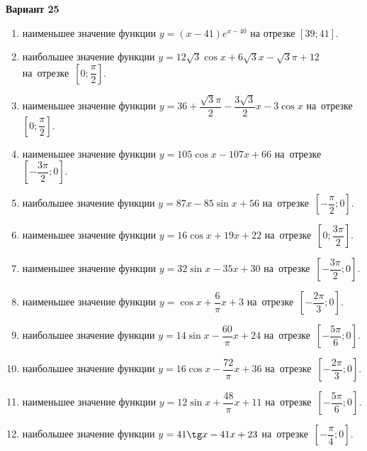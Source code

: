 \documentclass[a4paper,10pt]{article}
\begin{document}
\begin{center}\Large\textbf{Вариант 25}\end{center}

\begin{enumerate}
\item {} наименьшее значение функции $y = \left(x-41\right)e^{x-40}$ на отрезке $\left[39;41\right]$.

\item {} наибольшее значение функции $y = 12\sqrt{3}\cos x+6\sqrt{3}x-\sqrt{3}\pi +12$ на~отрезке~$\left[0;\dfrac{\pi }{2}\right]$.

\item {} наименьшее значение функции $y = 36+\dfrac{\sqrt{3} \pi}{2}-\dfrac{3\sqrt{3}}{2}x-3\cos x$ на~отрезке~$\left[0;\dfrac{\pi }{2}\right]$.

\item {} наименьшее значение функции $y = 105\cos x-107x+66$ на~отрезке~$\left[-\dfrac{3\pi }{2};0\right]$.

\item {} наибольшее значение функции $y = 87x-85\sin x+56$ на~отрезке~$\left[-\dfrac{\pi }{2};0\right]$.

\item {} наименьшее значение функции $y = 16\cos x+19x+22$ на~отрезке~$\left[0;\dfrac{3\pi }{2}\right]$.

\item {} наименьшее значение функции $y = 32\sin x-35x+30$ на~отрезке~$\left[-\dfrac{3\pi }{2};0\right]$.

\item {} наименьшее значение функции $y = \cos x+\dfrac{6}{\pi }x +3$ на~отрезке~$\left[-\dfrac{2\pi }{3};0\right]$.

\item {} наибольшее значение функции $y = 14\sin x-\dfrac{60}{\pi }x+24$ на~отрезке~$\left[-\dfrac{5\pi }{6};0\right]$.

\item {} наибольшее значение функции $y = 16\cos x-\dfrac{72}{\pi }x+36$ на~отрезке~$\left[-\dfrac{2\pi }{3};0\right]$.

\item {} наименьшее значение функции $y = 12\sin x+\dfrac{48}{\pi }x+11$ на~отрезке~$\left[-\dfrac{5\pi }{6};0\right]$.

\item {} наибольшее значение функции $y = 41\tg x-41x+23$ на~отрезке~$\left[-\dfrac{\pi }{4};0\right]$.


\end{enumerate}
\end{document}
